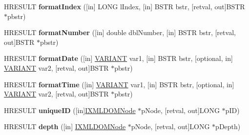 \begin{DoxyCompactItemize}
H\+R\+E\+S\+U\+LT {\bfseries format\+Index} (\mbox{[}in\mbox{]} L\+O\+NG l\+Index, \mbox{[}in\mbox{]} B\+S\+TR bstr, \mbox{[}retval, out\mbox{]}B\+S\+TR $\ast$pbstr)
\item 
\mbox{\label{interface_m_s_x_m_l2_1_1_i_x_t_l_runtime_a0652b99a2d9e73069aa2a1a9035783c9}} 
H\+R\+E\+S\+U\+LT {\bfseries format\+Number} (\mbox{[}in\mbox{]} double dbl\+Number, \mbox{[}in\mbox{]} B\+S\+TR bstr, \mbox{[}retval, out\mbox{]}B\+S\+TR $\ast$pbstr)
\item 
\mbox{\label{interface_m_s_x_m_l2_1_1_i_x_t_l_runtime_a3529a40732e6f5b2377cf7ccd2b88f03}} 
H\+R\+E\+S\+U\+LT {\bfseries format\+Date} (\mbox{[}in\mbox{]} \hyperlink{structtag_v_a_r_i_a_n_t}{V\+A\+R\+I\+A\+NT} var1, \mbox{[}in\mbox{]} B\+S\+TR bstr, \mbox{[}optional, in\mbox{]} \hyperlink{structtag_v_a_r_i_a_n_t}{V\+A\+R\+I\+A\+NT} var2, \mbox{[}retval, out\mbox{]}B\+S\+TR $\ast$pbstr)
\item 
\mbox{\label{interface_m_s_x_m_l2_1_1_i_x_t_l_runtime_ad69be2ddb5c7a2cf6b2946a066ec802a}} 
H\+R\+E\+S\+U\+LT {\bfseries format\+Time} (\mbox{[}in\mbox{]} \hyperlink{structtag_v_a_r_i_a_n_t}{V\+A\+R\+I\+A\+NT} var1, \mbox{[}in\mbox{]} B\+S\+TR bstr, \mbox{[}optional, in\mbox{]} \hyperlink{structtag_v_a_r_i_a_n_t}{V\+A\+R\+I\+A\+NT} var2, \mbox{[}retval, out\mbox{]}B\+S\+TR $\ast$pbstr)
\item 
\mbox{\label{interface_m_s_x_m_l2_1_1_i_x_t_l_runtime_ad67811db931cf9354bab3571164dfd95}} 
H\+R\+E\+S\+U\+LT {\bfseries unique\+ID} (\mbox{[}in\mbox{]}\hyperlink{interface_m_s_x_m_l2_1_1_i_x_m_l_d_o_m_node}{I\+X\+M\+L\+D\+O\+M\+Node} $\ast$p\+Node, \mbox{[}retval, out\mbox{]}L\+O\+NG $\ast$p\+ID)
\item 
\mbox{\label{interface_m_s_x_m_l2_1_1_i_x_t_l_runtime_a0eb28a3be84fffe585053c34fb771606}} 
H\+R\+E\+S\+U\+LT {\bfseries depth} (\mbox{[}in\mbox{]} \hyperlink{interface_m_s_x_m_l2_1_1_i_x_m_l_d_o_m_node}{I\+X\+M\+L\+D\+O\+M\+Node} $\ast$p\+Node, \mbox{[}retval, out\mbox{]}L\+O\+NG $\ast$p\+Depth)
\item 
\mbox{\label{interface_m_s_x_m_l2_1_1_i_x_t_l_runtime_ac4764c87ce6bcf3d79aef01c098dd714}} 

\end{DoxyCompactItemize}
